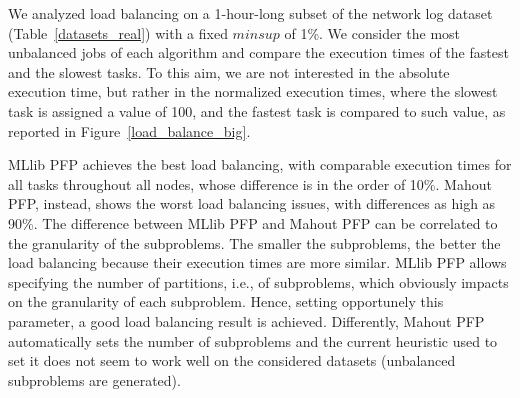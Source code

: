 

We analyzed load balancing on a 1-hour-long subset of the
network log dataset (Table~\ref{datasets_real}) with a fixed $minsup$ of 1\%.
We consider the most unbalanced jobs of each algorithm
and compare the execution times of the fastest and the slowest tasks.
To this aim, we are not interested in the absolute execution time,
but rather in the normalized execution times, where the slowest task is
assigned a value of 100, and the fastest task is compared to such value,
as reported in Figure~\ref{load_balance_big}.

MLlib PFP achieves the best load balancing, with comparable
execution times for all tasks throughout all nodes,
whose difference is in the order of 10\%.
Mahout PFP, instead, shows the worst load balancing issues,
with differences as high as 90\%. The difference between MLlib PFP and Mahout PFP can be correlated to the 
granularity of the subproblems. The smaller the subproblems, the better the load balancing
because their execution times are more similar. MLlib PFP allows specifying the number of partitions, i.e., of subproblems, which obviously impacts on the 
granularity of each subproblem. Hence, setting opportunely this parameter, a good load balancing result is achieved. Differently, 
Mahout PFP automatically sets the number of subproblems and the current heuristic used to set it does not seem to work well on the considered datasets
(unbalanced subproblems are generated).


